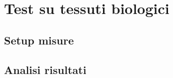 \chapter{Test su tessuti biologici}
\label{ch:bio}
\section{Setup misure}

\section{Analisi risultati}
